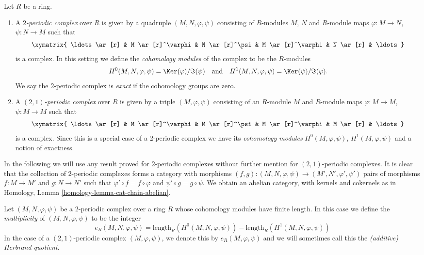 \begin{definition}
\label{definition-periodic-complex}
Let $R$ be a ring.
\begin{enumerate}
\item A {\it $2$-periodic complex} over $R$ is given
by a quadruple $(M, N, \varphi, \psi)$ consisting of
$R$-modules $M$, $N$ and $R$-module maps $\varphi : M \to N$,
$\psi : N \to M$ such that
$$
\xymatrix{
\ldots \ar[r] &
M \ar[r]^\varphi &
N \ar[r]^\psi &
M \ar[r]^\varphi &
N \ar[r] & \ldots
}
$$
is a complex. In this setting we define the {\it cohomology modules}
of the complex to be the $R$-modules
$$
H^0(M, N, \varphi, \psi) = \Ker(\varphi)/\Im(\psi)
\quad\text{and}\quad
H^1(M, N, \varphi, \psi) = \Ker(\psi)/\Im(\varphi).
$$
We say the $2$-periodic complex is {\it exact} if the cohomology
groups are zero.
\item A {\it $(2, 1)$-periodic complex} over $R$ is given
by a triple $(M, \varphi, \psi)$ consisting of an $R$-module $M$ and
$R$-module maps $\varphi : M \to M$, $\psi : M \to M$
such that
$$
\xymatrix{
\ldots \ar[r] &
M \ar[r]^\varphi &
M \ar[r]^\psi &
M \ar[r]^\varphi &
M \ar[r] & \ldots
}
$$
is a complex. Since this is a special case of a $2$-periodic complex
we have its {\it cohomology modules} $H^0(M, \varphi, \psi)$,
$H^1(M, \varphi, \psi)$ and a notion of exactness.
\end{enumerate}
\end{definition}

\noindent
In the following we will use any result proved for $2$-periodic
complexes without further mention for $(2, 1)$-periodic complexes.
It is clear that the collection of $2$-periodic complexes forms a
category with morphisms
$(f, g) : (M, N, \varphi, \psi) \to (M', N', \varphi', \psi')$
pairs of morphisms $f : M \to M'$ and $g : N \to N'$ such
that $\varphi' \circ f = f \circ \varphi$ and $\psi' \circ g = g \circ \psi$.
We obtain an abelian category, with kernels and cokernels as in
Homology, Lemma \ref{homology-lemma-cat-chain-abelian}.

\begin{definition}
\label{definition-periodic-length}
Let $(M, N, \varphi, \psi)$ be a $2$-periodic complex
over a ring $R$ whose cohomology modules have finite length.
In this case we define the {\it multiplicity} of $(M, N, \varphi, \psi)$
to be the integer
$$
e_R(M, N, \varphi, \psi) =
\text{length}_R(H^0(M, N, \varphi, \psi))
-
\text{length}_R(H^1(M, N, \varphi, \psi))
$$
In the case of a $(2, 1)$-periodic complex $(M, \varphi, \psi)$,
we denote this by $e_R(M, \varphi, \psi)$ and we will sometimes call this
the {\it (additive) Herbrand quotient}.
\end{definition}


